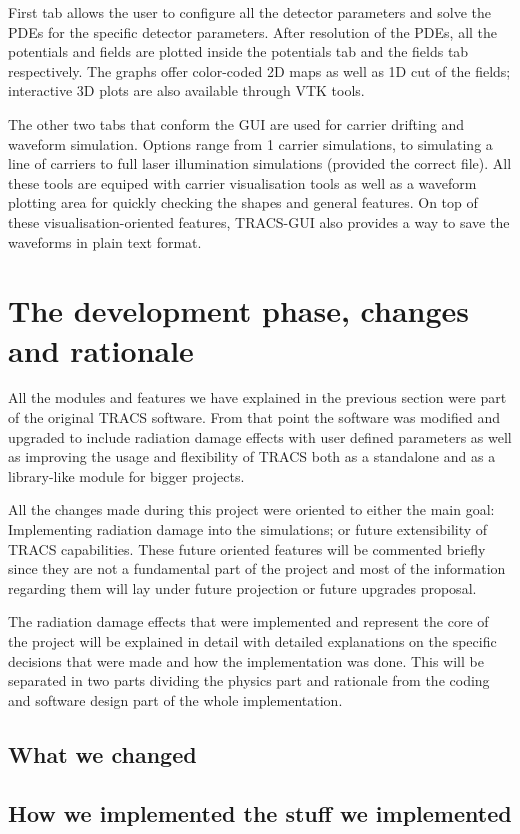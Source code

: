 First tab allows the user to configure all the detector parameters and solve the PDEs for the specific detector parameters. After resolution of the PDEs, all the potentials and fields are plotted inside the potentials tab and the fields tab respectively. The graphs offer color-coded 2D maps as well as 1D cut of the fields; interactive 3D plots are also available through VTK tools.

The other two tabs that conform the GUI are used for carrier drifting and waveform simulation. Options range from 1 carrier simulations, to simulating a line of carriers to full laser illumination simulations (provided the correct file). All these tools are equiped with carrier visualisation tools as well as a waveform plotting area for quickly checking the shapes and general features. On top of these visualisation-oriented features, TRACS-GUI also provides a way to save the waveforms in plain text format.

\section{The development phase, changes and rationale} %
\label{sec:werk}

All the modules and features we have explained in the previous section were part of the original TRACS software. From that point the software was modified and upgraded to include radiation damage effects  with user defined parameters as well as improving the usage and flexibility of TRACS both as a standalone and as a library-like module for bigger projects.

All the changes made during this project were oriented to either the main goal: Implementing radiation damage into the simulations; or future extensibility of TRACS capabilities. These future oriented features will be commented briefly since they are not a fundamental part of the project and most of the information regarding them will lay under future projection or future upgrades proposal.

The radiation damage effects that were implemented and represent the core of the project will be explained in detail with detailed explanations on the specific decisions that were made and how the implementation was done. This will be separated in two parts dividing the physics part and rationale from the coding and software design part of the whole implementation.

\subsection{What we changed}
\subsection{How we implemented the stuff we implemented}

